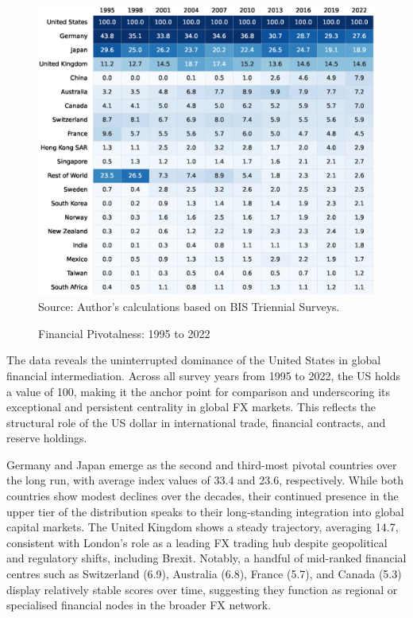 \documentclass[11pt]{article}
\begin{document}
\begin{figure}[H]
	\caption{Financial Pivotalness: 1995 to 2022}
	\label{fig:pivotal_financial}
	\centering
        \phantom{a}
	\includegraphics[width=\textwidth]{dataviz/results_pivotal6_snapshot.eps}
	{\footnotesize Source: Author's calculations based on BIS Triennial Surveys.}
\end{figure}

The data reveals the uninterrupted dominance of the United States in global financial intermediation. Across all survey years from 1995 to 2022, the US holds a value of 100, making it the anchor point for comparison and underscoring its exceptional and persistent centrality in global FX markets. This reflects the structural role of the US dollar in international trade, financial contracts, and reserve holdings.

Germany and Japan emerge as the second and third-most pivotal countries over the long run, with average index values of 33.4 and 23.6, respectively. While both countries show modest declines over the decades, their continued presence in the upper tier of the distribution speaks to their long-standing integration into global capital markets. The United Kingdom shows a steady trajectory, averaging 14.7, consistent with London’s role as a leading FX trading hub despite geopolitical and regulatory shifts, including Brexit. Notably, a handful of mid-ranked financial centres such as Switzerland (6.9), Australia (6.8), France (5.7), and Canada (5.3) display relatively stable scores over time, suggesting they function as regional or specialised financial nodes in the broader FX network.
\end{document}
